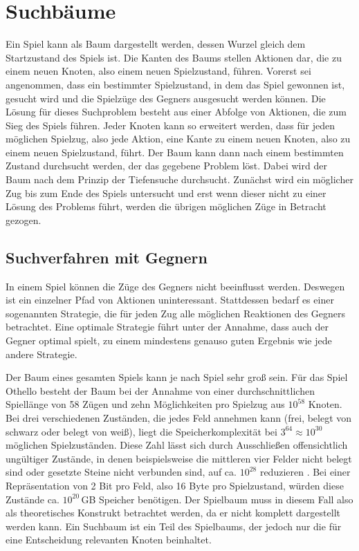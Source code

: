 \section{Suchbäume}
\label{sec:gametree}

Ein Spiel kann als Baum dargestellt werden, dessen Wurzel gleich dem Startzustand des Spiels ist. Die Kanten des Baums
stellen Aktionen dar, die zu einem neuen Knoten, also einem neuen Spielzustand, führen. Vorerst sei angenommen, dass ein
bestimmter Spielzustand, in dem das Spiel gewonnen ist, gesucht wird und die Spielzüge des Gegners ausgesucht werden
können. Die Lösung für dieses Suchproblem besteht aus einer Abfolge von Aktionen, die zum Sieg des Spiels führen. Jeder
Knoten kann so erweitert werden, dass für jeden möglichen Spielzug, also jede Aktion, eine Kante zu einem neuen Knoten,
also zu einem neuen Spielzustand, führt. Der Baum kann dann nach einem bestimmten Zustand durchsucht werden, der das
gegebene Problem löst. Dabei wird der Baum nach dem Prinzip der Tiefensuche durchsucht. Zunächst wird ein möglicher Zug
bis zum Ende des Spiels untersucht und erst wenn dieser nicht zu einer Lösung des Problems führt, werden die übrigen
möglichen Züge in Betracht gezogen.
\cite[S.~75]{ai2010russel}

\subsection{Suchverfahren mit Gegnern}
In einem Spiel können die Züge des Gegners nicht beeinflusst werden. Deswegen ist ein einzelner Pfad von Aktionen
uninteressant. Stattdessen bedarf es einer sogenannten Strategie, die für jeden Zug alle möglichen Reaktionen des
Gegners betrachtet. Eine optimale Strategie führt unter der Annahme, dass auch der Gegner optimal spielt, zu einem
mindestens genauso guten Ergebnis wie jede andere Strategie.
\cite[S.~163f.]{ai2010russel}

Der Baum eines gesamten Spiels kann je nach Spiel sehr groß sein. Für das Spiel Othello besteht der Baum bei der Annahme
von einer durchschnittlichen Spiellänge von 58 Zügen und zehn Möglichkeiten pro Spielzug aus $10^{58}$ Knoten. Bei drei
verschiedenen Zuständen, die jedes Feld annehmen kann (frei, belegt von schwarz oder belegt von weiß), liegt die
Speicherkomplexität bei $3^{64}\approx10^{30}$ möglichen Spielzuständen. Diese Zahl lässt sich durch Ausschließen
offensichtlich ungültiger Zustände, in denen beispielsweise die mittleren vier Felder nicht belegt sind oder gesetzte
Steine nicht verbunden sind, auf ca. $10^{28}$ reduzieren \cite[S.~167]{searchingforsolutions}.
Bei einer Repräsentation von 2 Bit pro Feld, also 16 Byte pro Spielzustand, würden diese Zustände ca. $10^{20}$\,GB
Speicher benötigen. Der Spielbaum muss in diesem Fall also als theoretisches Konstrukt betrachtet werden, da er nicht
komplett dargestellt werden kann. Ein Suchbaum ist ein Teil des Spielbaums, der jedoch nur die für eine Entscheidung
relevanten Knoten beinhaltet.
\cite[S.~162f.]{ai2010russel}

